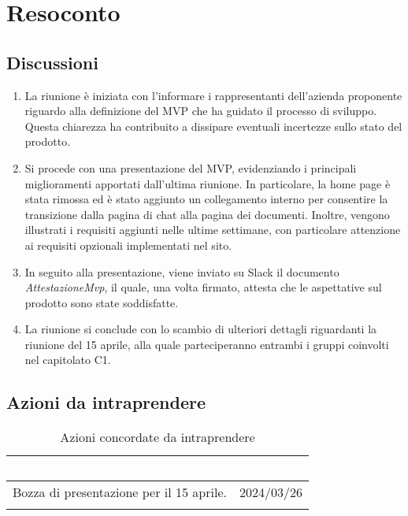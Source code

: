 \section{Resoconto} \label{sec:resoconto}
\subsection{Discussioni} \label{subsec:resdiscussione}
\begin{enumerate}
    \item La riunione è iniziata con l'informare i rappresentanti dell'azienda proponente riguardo alla definizione del MVP che ha guidato il processo di sviluppo. Questa chiarezza ha contribuito a dissipare eventuali incertezze sullo stato del prodotto.
    \item Si procede con una presentazione del MVP, evidenziando i principali miglioramenti apportati dall'ultima riunione. In particolare, la home page è stata rimossa ed è stato aggiunto un collegamento interno per consentire la transizione dalla pagina di chat alla pagina dei documenti. Inoltre, vengono illustrati i requisiti aggiunti nelle ultime settimane, con particolare attenzione ai requisiti opzionali implementati nel sito.
    \item In seguito alla presentazione, viene inviato su Slack il documento \textit{AttestazioneMvp}, il quale, una volta firmato, attesta che le aspettative sul prodotto sono state soddisfatte.
    \item La riunione si conclude con lo scambio di ulteriori dettagli riguardanti la riunione del 15 aprile, alla quale parteciperanno entrambi i gruppi coinvolti nel capitolato C1.
\end{enumerate}


\subsection{Azioni da intraprendere} \label{subsec:action}

{
\setlength{\tabcolsep}{10pt}
\renewcommand{\arraystretch}{1.5}
\begin{xltabular}{\textwidth}{| X | c |}
    \hline
     \textbf{\textcolor{white}{Azione}} & \textbf{\textcolor{white}{Scadenza}} \\
    \hline
    \endhead
    Bozza di presentazione per il 15 aprile.  & 2024/03/26\\
    \hline
    
     \caption{Azioni concordate da intraprendere}
    \label{tab:reqimp}
\end{xltabular}
}
